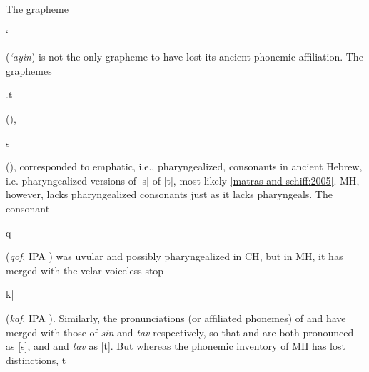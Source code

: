 The grapheme \begin{cjhebrew}`\end{cjhebrew} (\textit{`ayin}) is not the only 
grapheme to have 
lost its ancient phonemic affiliation. 
The graphemes \begin{cjhebrew}.t\end{cjhebrew} 
(\textit{}), \begin{cjhebrew}s\end{cjhebrew} 
(\textit{}), corresponded to emphatic, i.e., 
pharyngealized, consonants in ancient 
Hebrew, i.e. pharyngealized versions of [s] of [t], most likely 
\ref{matras-and-schiff:2005}.
\ac{MH}, however, lacks pharyngealized consonants just as 
it lacks pharyngeals. 
The consonant \begin{cjhebrew}q\end{cjhebrew} (\textit{qof}, 
IPA \textipa{[q]}) was uvular and 
possibly pharyngealized in \ac{CH}, but in \ac{MH}, 
it has merged with the velar voiceless stop
\begin{cjhebrew}k|\end{cjhebrew} (\textit{kaf}, IPA \textipa{[k]}).
Similarly, the pronunciations (or affiliated phonemes) of \textit{} and 
 \textit{} have merged with those of \textit{sin} and \textit{tav} respectively, 
 so that \textit{} and \textit{} are both pronounced as [s], 
 and \textit{} and \textit{tav} as [t]. But whereas the phonemic inventory of \ac{MH} has lost
 distinctions, t
%

